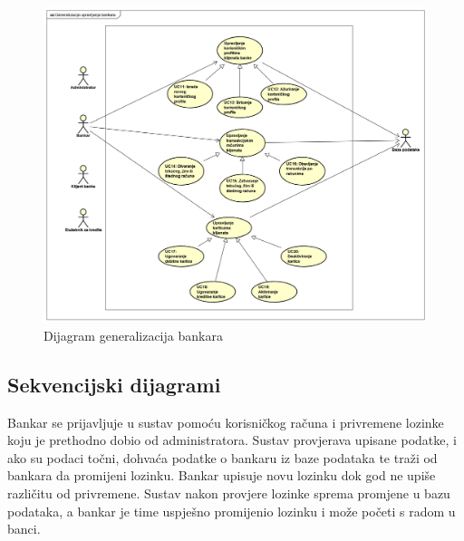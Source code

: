 				\begin{figure}[H]
					\includegraphics[scale=0.4]{slike/UseCase Diagram1Matija.PNG}
					\centering
					\caption{Dijagram generalizacija bankara}
					\label{fig:ucd1Matija}
				\end{figure}
				\eject		
				
			\subsection{Sekvencijski dijagrami}
				
				
				Bankar se prijavljuje u sustav pomoću korisničkog računa i privremene lozinke koju je prethodno dobio od administratora. Sustav provjerava upisane podatke, i ako su podaci točni, dohvaća podatke o bankaru iz baze podataka te traži od bankara da promijeni lozinku. Bankar upisuje novu lozinku dok god ne upiše različitu od privremene. Sustav nakon provjere lozinke sprema promjene u bazu podataka, a bankar je time uspješno promijenio lozinku i može početi s radom u banci.
				\eject
				

